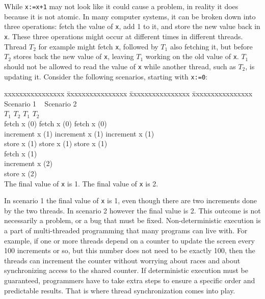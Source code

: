 While \texttt{x:=x+1} may not look like it could cause a problem, in reality it
does because it is not atomic. In many computer systems, it can be broken down
into three operations: fetch the value of \texttt{x}, add 1 to it, and
store the
new value back in \texttt{x}. These three operations might occur at different
times in different threads.  Thread $T_2$ for example might fetch \texttt{x},
followed by $T_1$ also fetching it, but before $T_2$ stores back the new value
of \texttt{x}, leaving $T_1$ working on the old value of \texttt{x}. $T_1$
should not be allowed to read the value of \texttt{x} while another
thread, such
as $T_2$, is updating it.  Consider the following scenarios, starting with
\texttt{x:=0}:
\medskip
\begin{tabbing}
xxxxxxxxxxxxxxxx \= xxxxxxxxxxxxxxxx \= xxxxxxxxxxxxxxxx \= xxxxxxxxxxxxxxxx
\kill
  Scenario 1     \> \                \> Scenario 2\\
  $T_1$          \> $T_2$            \> $T_1$            \> $T_2$ \\
  fetch x (0)    \> fetch x (0)      \> fetch x (0) \\
  increment x (1) \> increment x (1) \> increment x (1)  \\
  store x (1)    \> store  x (1)     \> store x (1)  \\
                 \>                  \>                  \> fetch x (1) \\
                 \>                  \>                  \> increment x (2) \\
                 \>                  \>                  \> store x (2) \\
The final value of \texttt{x} is 1. \> \> The final value of \texttt{x} is 2.
\end{tabbing}

In scenario 1 the final value of \texttt{x} is 1, even though there are two
increments done by the two threads. In scenario 2 however the final value is
2. This outcome is not necessarily a problem, or a bug that must be fixed.
Non-deterministic execution is a part of multi-threaded programming that many
programs can live with.  For example, if one or more threads depend on a counter
to update the screen every 100 increments or so, but this number does not need
to be exactly 100, then the threads can increment the counter without worrying
about races and about synchronizing access to the shared counter. If
deterministic execution must be guaranteed, programmers have to take extra steps
to ensure a specific order and predictable results. That is where thread
synchronization comes into play.

